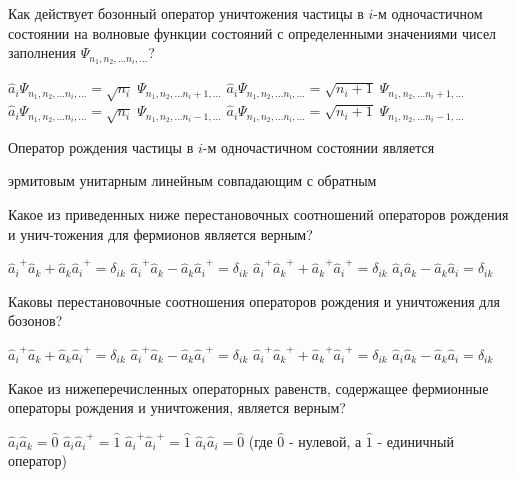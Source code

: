 \documentclass[11pt,a4paper]{exam}
\begin{document}
\begin{questions}
\question Как действует бозонный оператор уничтожения частицы в $i$-м одночастичном состоянии на волновые функции состояний с определенными значениями чисел заполнения ${\Psi _{{n_1},{n_2},...{n_i},...}}$?
\begin{choices}
\choice ${\hat a_i}{\Psi _{{n_1},{n_2},...{n_i},...}} = \sqrt {{n_i}} \;{\Psi _{{n_1},{n_2},...{n_i} + 1,...}}$     
\choice ${\hat a_i}{\Psi _{{n_1},{n_2},...{n_i},...}} = \sqrt {{n_i} + 1} \;{\Psi _{{n_1},{n_2},...{n_i} + 1,...}}$
\choice ${\hat a_i}{\Psi _{{n_1},{n_2},...{n_i},...}} = \sqrt {{n_i}} \;{\Psi _{{n_1},{n_2},...{n_i} - 1,...}}$     
\choice ${\hat a_i}{\Psi _{{n_1},{n_2},...{n_i},...}} = \sqrt {{n_i} + 1} \;{\Psi _{{n_1},{n_2},...{n_i} - 1,...}}$
\end{choices}

\question Оператор рождения частицы в $i$-м одночастичном состоянии является
\begin{choices}
\choice эрмитовым   
\choice унитарным      
\choice линейным    
\choice совпадающим с обратным 
\end{choices}

\question Какое из приведенных ниже перестановочных соотношений операторов рождения и унич-тожения для фермионов является верным?
\begin{choices}
\choice ${\hat a_i}^ + {\hat a_k} + {\hat a_k}{\hat a_i}^ +  = {\delta _{ik}}$        
\choice ${\hat a_i}^ + {\hat a_k} - {\hat a_k}{\hat a_i}^ +  = {\delta _{ik}}$
\choice ${\hat a_i}^ + {\hat a_k}^ +  + {\hat a_k}^ + {\hat a_i}^ +  = {\delta _{ik}}$      
\choice ${\hat a_i}{\hat a_k} - {\hat a_k}{\hat a_i} = {\delta _{ik}}$
\end{choices}

\question Каковы перестановочные соотношения операторов рождения и уничтожения для бозонов?
\begin{choices}
\choice ${\hat a_i}^ + {\hat a_k} + {\hat a_k}{\hat a_i}^ +  = {\delta _{ik}}$        
\choice ${\hat a_i}^ + {\hat a_k} - {\hat a_k}{\hat a_i}^ +  = {\delta _{ik}}$
\choice ${\hat a_i}^ + {\hat a_k}^ +  + {\hat a_k}^ + {\hat a_i}^ +  = {\delta _{ik}}$      
\choice ${\hat a_i}{\hat a_k} - {\hat a_k}{\hat a_i} = {\delta _{ik}}$
\end{choices}

\question Какое из нижеперечисленных операторных равенств, содержащее фермионные операторы рождения и уничтожения, является верным?
\begin{choices}
\choice ${\hat a_i}{\hat a_k} = \hat 0$  
\choice ${\hat a_i}{\hat a_i}^ +  = \hat 1$ 
\choice ${\hat a_i}^ + {\hat a_i}^ +  = \hat 1$   
\choice ${\hat a_i}{\hat a_i} = \hat 0$ 
(где $\hat 0$ - нулевой, а $\hat 1$ - единичный оператор)
\end{choices}


\end{questions}
\end{document}
